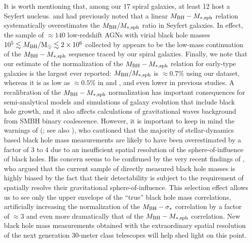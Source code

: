 It is worth mentioning that, among our 17 spiral galaxies, at least 12 host a Seyfert nucleus. 
\citet{wandel1999} and \citet{ryan2007} had previously noted that a linear $M_{\rm BH} - M_{\rm *,sph}$ relation 
systematically overestimates the $M_{\rm BH}/M_{\rm *,sph}$ ratio in Seyfert galaxies. 
In effect, the sample of $\approx 140$ low-redshift AGNs with virial black hole masses 
$10^5 \lesssim M_{\rm BH}/{\rm M_\odot} \lesssim 2 \times 10^6$ collected by \citet{grahamscott2015} 
appears to be the low-mass continuation of the $M_{\rm BH} - M_{\rm *,sph}$ sequence traced by our spiral galaxies. 
Finally, we note that our estimate of the normalization of the $M_{\rm BH} - M_{\rm *,sph}$ relation for early-type galaxies 
is the largest ever reported: $M_{\rm BH}/M_{\rm *,sph}$ is $\approx 0.7\%$ using our dataset, 
whereas it is as low as $\approx 0.5\%$ in \citet{scott2013} and \citet{kormendyho2013}, 
and even lower in previous studies. 
A recalibration of the $M_{\rm BH} - M_{\rm *,sph}$ normalization has important consequences 
for semi-analytical models and simulations of galaxy evolution that include black hole growth, 
and it also affects calculations of gravitational waves background from SMBH binary coalescence. 
However, it is important to keep in mind the warnings of \citeauthor{merritt2013book} 
(\citeyear{merritt2013book}; see also \citealt{ferraresemerritt2000,merrittferrarese2001ms,merrittferrarese2001sphinfl,
valluri2004,ferrareseford2005}), 
who cautioned that the majority of stellar-dynamics based black hole mass measurements 
are likely to have been overestimated by a factor of $3$ to $4$ 
due to an insufficient spatial resolution of the sphere-of-influence of black holes. 
His concern seems to be confirmed by the very recent findings of \citet{shankar2016}, 
who argued that the current sample of directly measured black hole masses 
is highly biased by the fact that their detectability 
is subject to the requirement of spatially resolve their gravitational sphere-of-influence. 
This selection effect allows us to see only the upper envelope of the ``true'' black hole mass correlations, 
artificially increasing the normalization of the $M_{\rm BH} - \sigma_*$ correlation by a factor of $\approx 3$ 
and even more dramatically that of the $M_{\rm BH} - M_{\rm *,sph}$ correlation. 
New black hole mass measurements obtained with the extraordinary spatial resolution of the next generation 
30-meter class telescopes will help shed light on this point.  \\

